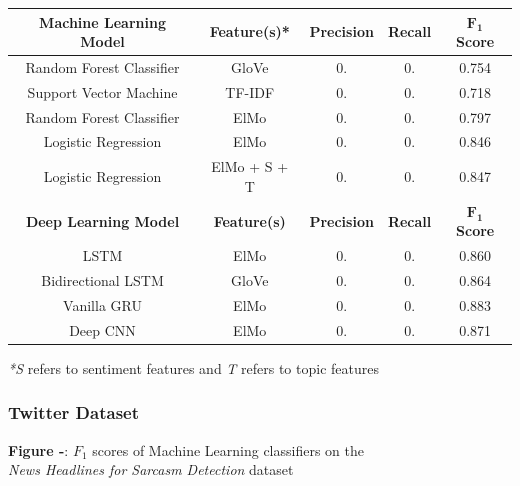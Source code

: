 \documentclass[12pt,a4paper]{article}
\begin{document}
\begin{center}
	\begin{tabular}{ |c||c|c|c|c|}
		\hline
		\textbf{Machine Learning Model}& \textbf{Feature(s)*} & \textbf{Precision} & \textbf{Recall} & \textbf{$\mathbf{F_1}$ Score}\\
		\hline\hline
		Random Forest Classifier & GloVe  & 0.   & 0. & 0.754\\
		Support Vector Machine & TF-IDF  & 0.   & 0. & 0.718\\
		Random Forest Classifier & ElMo  & 0.   & 0. & 0.797\\
		Logistic Regression & ElMo  & 0.   & 0. & 0.846\\
		Logistic Regression & ElMo + S + T & 0.   & 0. & 0.847\\
		\hline\hline
		\textbf{Deep Learning Model}& \textbf{Feature(s)} & \textbf{Precision} & \textbf{Recall} & \textbf{$\mathbf{F_1}$ Score}\\
		\hline
		LSTM & ElMo  & 0.   & 0. & 0.860\\
		Bidirectional LSTM & GloVe  & 0.   & 0. & 0.864\\
		Vanilla GRU & ElMo  & 0.   & 0. & 0.883\\
		Deep CNN & ElMo & 0.   & 0. & 0.871\\
		\hline
	\end{tabular}
\end{center}
\textit{*S} refers to sentiment features and \textit{T} refers to topic features


\subsubsection{Twitter Dataset}
\begin{center}
	\textbf{Figure -}: $F_1$ scores of Machine Learning classifiers on the \\\textit{News Headlines for Sarcasm Detection} dataset
\end{center}
\end{document}
